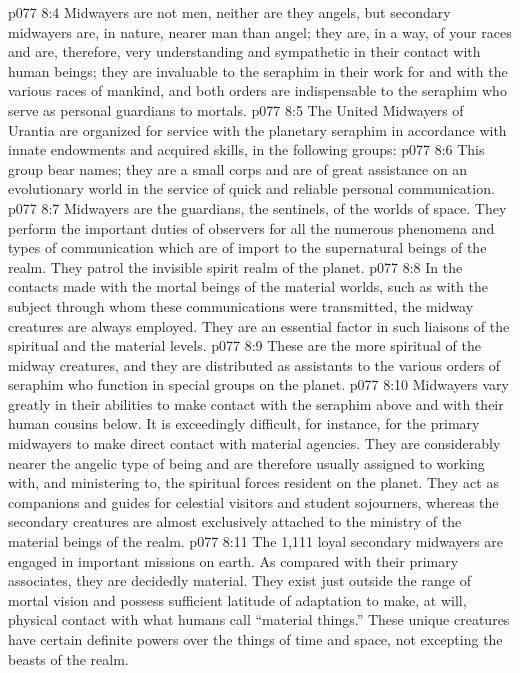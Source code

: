 \vs p077 8:4 Midwayers are not men, neither are they angels, but secondary midwayers are, in nature, nearer man than angel; they are, in a way, of your races and are, therefore, very understanding and sympathetic in their contact with human beings; they are invaluable to the seraphim in their work for and with the various races of mankind, and both orders are indispensable to the seraphim who serve as personal guardians to mortals.
\vs p077 8:5 \pc The United Midwayers of Urantia are organized for service with the planetary seraphim in accordance with innate endowments and acquired skills, in the following groups:
\vs p077 8:6 \bibnobreakspace {} This group bear names; they are a small corps and are of great assistance on an evolutionary world in the service of quick and reliable personal communication.
\vs p077 8:7 \bibnobreakspace {} Midwayers are the guardians, the sentinels, of the worlds of space. They perform the important duties of observers for all the numerous phenomena and types of communication which are of import to the supernatural beings of the realm. They patrol the invisible spirit realm of the planet.
\vs p077 8:8 \bibnobreakspace {} In the contacts made with the mortal beings of the material worlds, such as with the subject through whom these communications were transmitted, the midway creatures are always employed. They are an essential factor in such liaisons of the spiritual and the material levels.
\vs p077 8:9 \bibnobreakspace {} These are the more spiritual of the midway creatures, and they are distributed as assistants to the various orders of seraphim who function in special groups on the planet.
\vs p077 8:10 \pc Midwayers vary greatly in their abilities to make contact with the seraphim above and with their human cousins below. It is exceedingly difficult, for instance, for the primary midwayers to make direct contact with material agencies. They are considerably nearer the angelic type of being and are therefore usually assigned to working with, and ministering to, the spiritual forces resident on the planet. They act as companions and guides for celestial visitors and student sojourners, whereas the secondary creatures are almost exclusively attached to the ministry of the material beings of the realm.
\vs p077 8:11 The 1,111 loyal secondary midwayers are engaged in important missions on earth. As compared with their primary associates, they are decidedly material. They exist just outside the range of mortal vision and possess sufficient latitude of adaptation to make, at will, physical contact with what humans call “material things.” These unique creatures have certain definite powers over the things of time and space, not excepting the beasts of the realm.
